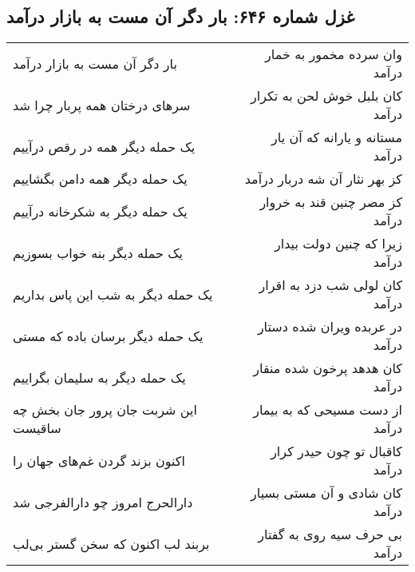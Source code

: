 \begin{center}
\section*{غزل شماره ۶۴۶: بار دگر آن مست به بازار درآمد}
\label{sec:0646}
\begin{longtable}{l p{0.5cm} r}
بار دگر آن مست به بازار درآمد
&&
وان سرده مخمور به خمار درآمد
\\
سرهای درختان همه پربار چرا شد
&&
کان بلبل خوش لحن به تکرار درآمد
\\
یک حمله دیگر همه در رقص درآییم
&&
مستانه و یارانه که آن یار درآمد
\\
یک حمله دیگر همه دامن بگشاییم
&&
کز بهر نثار آن شه دربار درآمد
\\
یک حمله دیگر به شکرخانه درآییم
&&
کز مصر چنین قند به خروار درآمد
\\
یک حمله دیگر بنه خواب بسوزیم
&&
زیرا که چنین دولت بیدار درآمد
\\
یک حمله دیگر به شب این پاس بداریم
&&
کان لولی شب دزد به اقرار درآمد
\\
یک حمله دیگر برسان باده که مستی
&&
در عربده ویران شده دستار درآمد
\\
یک حمله دیگر به سلیمان بگراییم
&&
کان هدهد پرخون شده منقار درآمد
\\
این شربت جان پرور جان بخش چه ساقیست
&&
از دست مسیحی که به بیمار درآمد
\\
اکنون بزند گردن غم‌های جهان را
&&
کاقبال تو چون حیدر کرار درآمد
\\
دارالحرج امروز چو دارالفرجی شد
&&
کان شادی و آن مستی بسیار درآمد
\\
بربند لب اکنون که سخن گستر بی‌لب
&&
بی حرف سیه روی به گفتار درآمد
\\
\end{longtable}
\end{center}
